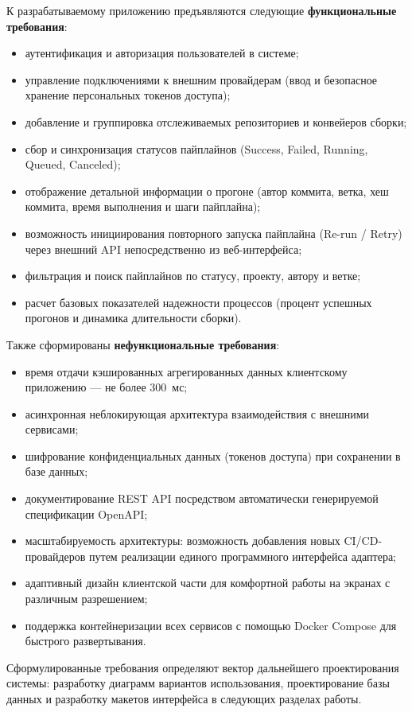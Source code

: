 К разрабатываемому приложению предъявляются следующие \textbf{функциональные требования}:
\begin{itemize}
    \item аутентификация и авторизация пользователей в системе;
    \item управление подключениями к внешним провайдерам (ввод и безопасное хранение персональных токенов доступа);
    \item добавление и группировка отслеживаемых репозиториев и конвейеров сборки;
    \item сбор и синхронизация статусов пайплайнов (Success, Failed, Running, Queued, Canceled);
    \item отображение детальной информации о прогоне (автор коммита, ветка, хеш коммита, время выполнения и шаги пайплайна);
    \item возможность инициирования повторного запуска пайплайна (Re-run / Retry) через внешний API непосредственно из веб-интерфейса;
    \item фильтрация и поиск пайплайнов по статусу, проекту, автору и ветке;
    \item расчет базовых показателей надежности процессов (процент успешных прогонов и динамика длительности сборки).
\end{itemize}

Также сформированы \textbf{нефункциональные требования}:
\begin{itemize}
    \item время отдачи кэшированных агрегированных данных клиентскому приложению --- не более 300~мс;
    \item асинхронная неблокирующая архитектура взаимодействия с внешними сервисами;
    \item шифрование конфиденциальных данных (токенов доступа) при сохранении в базе данных;
    \item документирование REST API посредством автоматически генерируемой спецификации OpenAPI;
    \item масштабируемость архитектуры: возможность добавления новых CI/CD-провайдеров путем реализации единого программного интерфейса адаптера;
    \item адаптивный дизайн клиентской части для комфортной работы на экранах с различным разрешением;
    \item поддержка контейнеризации всех сервисов с помощью Docker Compose для быстрого развертывания.
\end{itemize}

Сформулированные требования определяют вектор дальнейшего проектирования системы: разработку диаграмм вариантов использования, проектирование базы данных и разработку макетов интерфейса в следующих разделах работы.